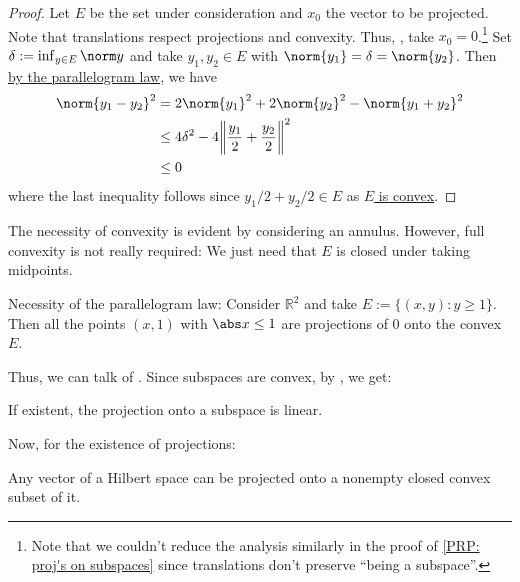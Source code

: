 	\begin{proof}
		Let $E$ be the set under consideration and $x_0$ the vector to be projected. Note that translations respect projections and convexity. Thus, \wlogg, take $x_0 = 0$.\footnote{Note that we couldn't reduce the analysis similarly in the proof of \ref{PRP: proj's on subspaces} since translations don't preserve ``being a subspace''.}
		Set $\delta := \inf_{y\in E} \norm y$ and take $y_1, y_2\in E$ with $\norm{y_1} = \delta = \norm{y_2}$. Then \uline{by the parallelogram law},
		we have
		\begin{align*}
			\norm{y_1 - y_2}^2 & = 2\norm{y_1}^2 + 2\norm{y_2}^2 - \norm{y_1 + y_2}^2\\
			& \le 4\delta^2 - 4\biggl\| \frac{y_1}{2} + \frac{y_2}{2} \biggr\|^2\\
			& \le 0
		\end{align*}
		where the last inequality follows since $y_1/2 + y_2/2\in E$ as \uline{$E$ is convex}.
	\end{proof}
	
	\begin{rmk}
		\begin{rmklist}
			\item The necessity of convexity is evident by considering an annulus. However, full convexity is not really required: We just need that $E$ is closed under taking midpoints.
			
			\item Necessity of the parallelogram law: Consider $\mathbb R^2$ and take $E := \{(x, y) : y\ge 1\}$. Then all the points $(x, 1)$ with $\abs x\le 1$ are projections of $0$ onto the convex $E$.
		\end{rmklist}
	\end{rmk}
	
	Thus, we can talk of . Since subspaces are convex, by , we get:
	
	\begin{cor}
		If existent, the projection onto a subspace is linear.
	\end{cor}
	
	Now, for the existence of projections:
	
	\begin{thm}\label{THM: proj's in Hilbert spaces}
		Any vector of a Hilbert space
		can be projected onto a nonempty closed convex subset of it.
	\end{thm}
	

